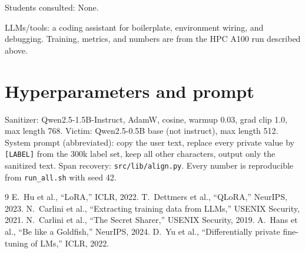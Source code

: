 \documentclass[11pt]{article}
\begin{document}
Students consulted: None.

LLMs/tools: a coding assistant for boilerplate, environment wiring, and debugging. Training, metrics, and numbers are from the HPC A100 run described above.

\appendix
\section{Hyperparameters and prompt}
\vspace{-0.1em}
Sanitizer: Qwen2.5-1.5B-Instruct, AdamW, cosine, warmup 0.03, grad clip 1.0, max length 768. Victim: Qwen2.5-0.5B base (not instruct), max length 512. System prompt (abbreviated): copy the user text, replace every private value by \texttt{[LABEL]} from the 300k label set, keep all other characters, output only the sanitized text. Span recovery: \texttt{src/lib/align.py}. Every number is reproducible from \texttt{run\_all.sh} with seed 42.

\begin{thebibliography}{9}
E.~Hu et al., ``LoRA,'' ICLR, 2022.
T.~Dettmers et al., ``QLoRA,'' NeurIPS, 2023.
N.~Carlini et al., ``Extracting training data from LLMs,'' USENIX Security, 2021.
N.~Carlini et al., ``The Secret Sharer,'' USENIX Security, 2019.
A.~Hans et al., ``Be like a Goldfish,'' NeurIPS, 2024.
D.~Yu et al., ``Differentially private fine-tuning of LMs,'' ICLR, 2022.
\end{thebibliography}
\end{document}
